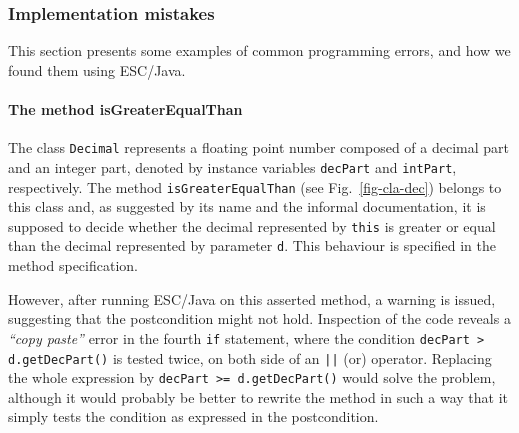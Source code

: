 \documentclass[a4paper]{llncs}
\begin{document}
\subsubsection{Implementation mistakes}
This section presents some examples of common programming
errors, and how we found them using ESC/Java.



\paragraph{The method isGreaterEqualThan}


The class \texttt{Decimal} 
represents a floating point number 
composed of a decimal part and an integer part,
denoted by instance variables \texttt{decPart}
and \texttt{intPart}, respectively. The
method \texttt{isGreaterEqualThan} (see Fig.~\ref{fig-cla-dec})
belongs to this class and, as suggested by its name and the informal
documentation, it is supposed to decide whether the
decimal represented by \texttt{this} is greater or equal than the
decimal represented by parameter
\texttt{d}. This behaviour is specified in the method specification.

However, after running ESC/Java on this asserted method, a warning is
issued, suggesting that the postcondition
might not hold. Inspection of the code reveals a
\emph{``copy paste''} error in the fourth \texttt{if} statement, where 
the condition \texttt{decPart > d.getDecPart()}
is tested twice, on both side of an \texttt{||}
(or) operator. Replacing the whole expression
by \texttt{decPart >= d.getDecPart()} would solve the problem,
although it would probably be better to rewrite the method in such a
way that it simply tests the condition as expressed in the
postcondition.
\end{document}
